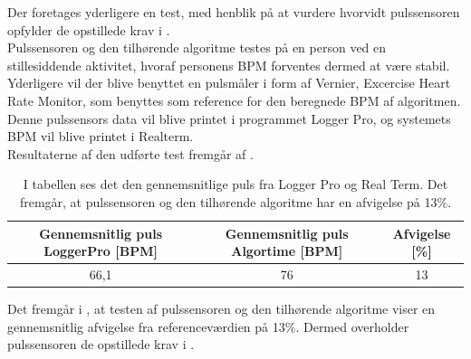 Der foretages yderligere en test, med henblik på at vurdere hvorvidt pulssensoren opfylder de opstillede krav i . \\
Pulssensoren og den tilhørende algoritme testes på en person ved en stillesiddende aktivitet, hvoraf personens BPM forventes dermed at være stabil. Yderligere vil der blive benyttet en pulsmåler i form af Vernier, Excercise Heart Rate Monitor, som benyttes som reference for den beregnede BPM af algoritmen. Denne pulssensors data vil blive printet i programmet Logger Pro, og systemets BPM vil blive printet i Realterm. \\
Resultaterne af den udførte test fremgår af .
\begin{table}[H]
	\centering
	\begin{tabular}{ccc} \hline
		\rowcolor[HTML]{C0C0C0} 
			Gennemsnitlig puls LoggerPro {[}BPM{]} & Gennemsnitlig puls Algortime {[}BPM{]} & Afvigelse {[}\%{]} \\ \hline
			66,1 & 76 & 13 \\ \hline
		\end{tabular}%
	\caption{I tabellen ses det den gennemsnitlige puls fra Logger Pro og Real Term. Det fremgår, at pulssensoren og den tilhørende algoritme har en afvigelse på 13\%.}
	\label{tab:test_pulssystem}
\end{table} \vspace{-0.5cm}
Det fremgår i , at testen af pulssensoren og den tilhørende algoritme viser en gennemsnitlig afvigelse fra referenceværdien på 13\%. Dermed overholder pulssensoren de opstillede krav i .